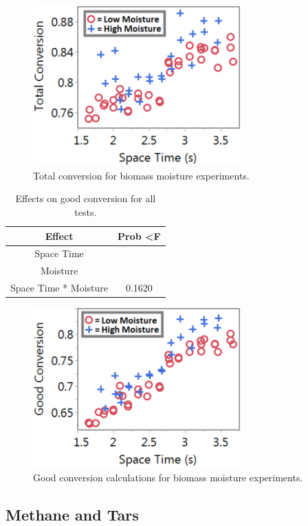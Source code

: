 \documentclass[11pt,twocolumn]{article}
\begin{document}
\begin{figure}
\centering
\includegraphics[width = 8cm]{x_tot.png}
\caption{Total conversion for biomass moisture experiments.}
\label{plot_total}
\end{figure}

\begin{table}
	\centering
	\caption{Effects on good conversion for all tests.}
	\label{x_good}
	\begin{tabular}{c c}
	\toprule
	Effect				&	Prob \textless F	\\
	\midrule
	Space Time			&	\color{red}{\textless 0.0001} \\
	Moisture				&	\color{red}{\textless 0.0001} \\
	Space Time * Moisture	&	0.1620 \\
	\bottomrule
	\end{tabular}
\end{table}

\begin{figure}
\centering
\includegraphics[width = 8cm]{x_good.png}
\caption{Good conversion calculations for biomass moisture experiments.}
\label{plot_good}
\end{figure}

\subsection*{Methane and Tars}
\end{document}
